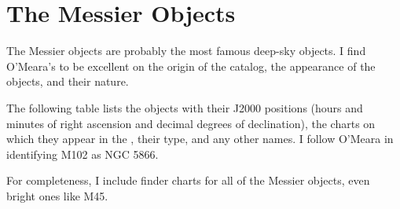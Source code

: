 
\chapter{The Messier Objects}

The Messier objects are probably the most famous deep-sky objects. I find O’Meara’s  to be excellent  on the origin of the catalog, the appearance of the objects, and their nature.

The following table lists the objects with their J2000 positions (hours and minutes of right ascension and decimal degrees of declination), the charts on which they appear in the {\PSA}, their type, and any other names. I follow O’Meara in identifying M102 as NGC 5866.

For completeness, I include finder charts for all of the Messier objects, even bright ones like M45.


\clearpage

